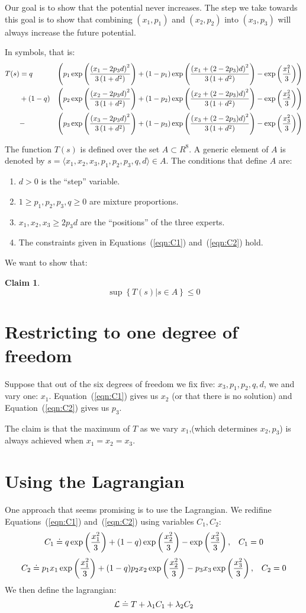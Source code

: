 \documentclass{article}[12pt]
\theoremstyle{plain}
\newtheorem{claim}[lemma]{Claim}
\begin{document}
Our goal is to show that the potential never increases. The step we
take towards this goal is to show that combining $(x_1,p_1)$ and
$(x_2,p_2)$ into $(x_3,p_3)$ will always increase the future
potential.

In symbols, that is:
\begin{eqnarray}
T(s) &= q& \paren{\changeExpr{x_1}{p_1}{d}{-2p_3}{+(2-2p_3)}} \\
&+
(1-q)&\paren{\changeExpr{x_2}{p_2}{d}{-2p_3}{+(2-2p_3)}} \notag \\
&-
&\paren{\changeExpr{x_3}{p_3}{d}{-2p_3}{+(2-2p_3)}} \notag
\end{eqnarray}

The function $T(s)$ is defined over the set $A\subset R^8$.
A generic element of $A$ is denoted by
$s=\langle x_1,x_2,x_3,p_1,p_2,p_3,q,d \rangle \in A$. The conditions
that define $A$ are:
\begin{enumerate}
\item $d>0$ is the ``step'' variable.
\item $1 \geq  p_1,p_2,p_3,q \geq 0$ are mixture proportions.
\item $x_1,x_2,x_3 \geq 2p_3 d$ are the ``positions'' of the three
  experts. 
\item The constraints given in Equations~(\ref{eqn:C1})
  and~(\ref{eqn:C2}) hold. 
\end{enumerate}

We want to show that:
\begin{claim}
\[
\sup \left\{T(s)\left| s \in A \right.\right\} \leq 0
\]
\end{claim}

\section{Restricting to one degree of freedom}
Suppose that out of the six degrees of freedom 
we fix five: $x_3,p_1,p_2,q,d$, we and vary one: $x_1$. 
Equation~(\ref{eqn:C1}) gives us $x_2$ (or that there is no solution)
and Equation~(\ref{eqn:C2}) gives us $p_3$. 

The claim is that the maximum of $T$ as we vary $x_1$,(which
determines $x_2,p_3$) is always achieved when $x_1=x_2=x_3$.

\section{Using the Lagrangian}
One approach that seems promising is to use the Lagrangian. We
redifine Equations~(\ref{eqn:C1}) and~(\ref{eqn:C2}) using variables $C_1,C_2$:
\begin{equation}
C_1\doteq q \potExpr{x_1}{}+(1-q)\potExpr{x_2}{} -\potExpr{x_3}{},\;\;\; C_1=0
\end{equation}
\begin{equation}
C_2\doteq p_1 x_1 \potExpr{x_1}{}+(1-q) p_2 x_2 \potExpr{x_2}{} - p_3
x_3 \potExpr{x_3}{},\;\;\;C_2=0
\end{equation}
We then define the lagrangian:
\newcommand{\Lag}{{\cal L}}
\[
\Lag \doteq T+\lambda_1 C_1 +\lambda_2 C_2
\]
\end{document}
